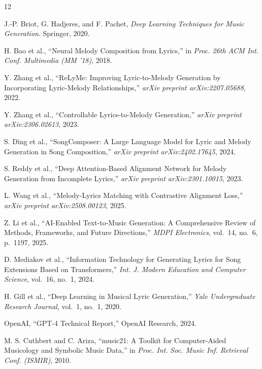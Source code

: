 \documentclass[conference]{IEEEtran}
\begin{document}


\begin{thebibliography}{12}

J.-P. Briot, G. Hadjeres, and F. Pachet,
\textit{Deep Learning Techniques for Music Generation}.
Springer, 2020.

H. Bao et al.,
``Neural Melody Composition from Lyrics,''
in \textit{Proc. 26th ACM Int. Conf. Multimedia (MM '18)}, 2018.

Y. Zhang et al.,
``ReLyMe: Improving Lyric-to-Melody Generation by Incorporating
Lyric-Melody Relationships,''
\textit{arXiv preprint arXiv:2207.05688}, 2022.

Y. Zhang et al.,
``Controllable Lyrics-to-Melody Generation,''
\textit{arXiv preprint arXiv:2306.02613}, 2023.

S. Ding et al.,
``SongComposer: A Large Language Model for Lyric and Melody Generation
in Song Composition,''
\textit{arXiv preprint arXiv:2402.17645}, 2024.

S. Reddy et al.,
``Deep Attention-Based Alignment Network for Melody Generation from
Incomplete Lyrics,''
\textit{arXiv preprint arXiv:2301.10015}, 2023.

L. Wang et al.,
``Melody-Lyrics Matching with Contrastive Alignment Loss,''
\textit{arXiv preprint arXiv:2508.00123}, 2025.

Z. Li et al.,
``AI-Enabled Text-to-Music Generation: A Comprehensive Review of Methods,
Frameworks, and Future Directions,''
\textit{MDPI Electronics}, vol.\ 14, no.\ 6, p.\ 1197, 2025.

D. Mediakov et al.,
``Information Technology for Generating Lyrics for Song Extensions Based
on Transformers,''
\textit{Int. J. Modern Education and Computer Science}, vol.\ 16, no.\ 1, 2024.

H. Gill et al.,
``Deep Learning in Musical Lyric Generation,''
\textit{Yale Undergraduate Research Journal}, vol.\ 1, no.\ 1, 2020.

OpenAI,
``GPT-4 Technical Report,''
OpenAI Research, 2024.

M. S. Cuthbert and C. Ariza,
``music21: A Toolkit for Computer-Aided Musicology and Symbolic Music Data,''
in \textit{Proc. Int. Soc. Music Inf. Retrieval Conf. (ISMIR)}, 2010.

\end{thebibliography}
\end{document}
